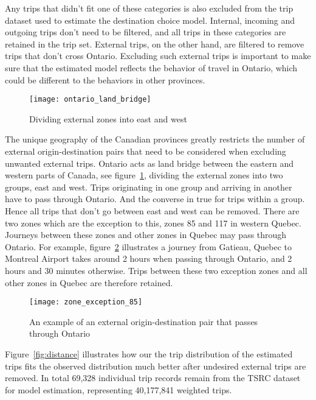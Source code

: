 Any trips that didn't fit one of these categories is also excluded from the trip dataset used to estimate the destination choice model. Internal, incoming and outgoing trips don't need to be filtered, and all trips in these categories are retained in the trip set. External trips, on the other hand, are filtered to remove trips that don't cross Ontario. Excluding such external trips is important to make sure that the estimated model reflects the behavior of travel in Ontario, which could be different to the behaviors in other provinces. 

\begin{figure}[H]
\centering
\texttt{[image: ontario\_land\_bridge]}
\caption{Dividing external zones into east and west}
\label{fig:bridge}
\end{figure}

The unique geography of the Canadian provinces greatly restricts the number of external origin-destination pairs that need to be considered when excluding unwanted external trips. Ontario acts as land bridge between the eastern and western parts of Canada, see figure~\ref{fig:bridge}, dividing the external zones into two groups, east and west. Trips originating in one group and arriving in another have to pass through Ontario. And the converse in true for trips within a group. Hence all trips that don't go between east and west can be removed. There are two zones which are the exception to this, zones 85 and 117 in western Quebec. Journeys between these zones and other zones in Quebec may pass through Ontario. For example, figure~\ref{fig:exception85} illustrates a journey from Gatieau, Quebec to Montreal Airport takes around 2 hours when passing through Ontario, and 2 hours and 30 minutes otherwise. Trips between these two exception zones and all other zones in Quebec are therefore retained. 

\begin{figure}[H]
\centering
\texttt{[image: zone\_exception\_85]}
\caption{An example of an external origin-destination pair that passes through Ontario}
\label{fig:exception85}
\end{figure}


Figure~\ref{fig:distance} illustrates how our the trip distribution of the estimated trips fits the observed distribution much better after undesired external trips are removed. In total 69,328 individual trip records remain from the TSRC dataset for model estimation, representing 40,177,841 weighted trips.

